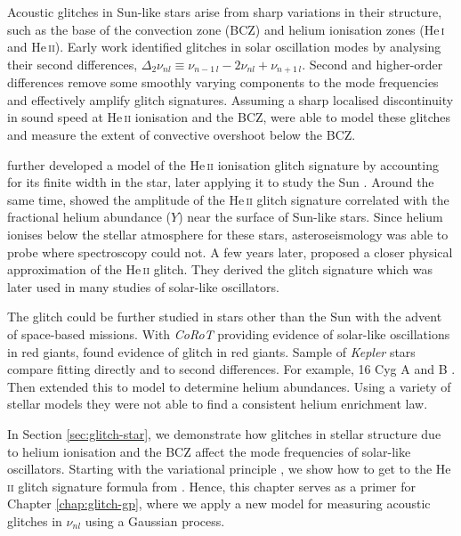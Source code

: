Acoustic glitches in Sun-like stars arise from sharp variations in their structure, such as the base of the convection zone (BCZ) and helium ionisation zones (He\,\textsc{i} and He\,\textsc{ii}). Early work identified glitches in solar oscillation modes by analysing their second differences, \(\Delta_2\nu_{nl} \equiv \nu_{n-1\,l} - 2\nu_{nl} + \nu_{n+1\,l}\). Second and higher-order differences remove some smoothly varying components to the mode frequencies and effectively amplify glitch signatures. Assuming a sharp localised discontinuity in sound speed at He\,\textsc{ii} ionisation and the BCZ, \citet{Basu.Antia.ea1994,Basu1997} were able to model these glitches and measure the extent of convective overshoot below the BCZ.

\citet{Monteiro.Thompson1998} further developed a model of the He\,\textsc{ii} ionisation glitch signature by accounting for its finite width in the star, later applying it to study the Sun \citep{Monteiro.Thompson2005}. Around the same time, \citet{Basu.Mazumdar.ea2004} showed the amplitude of the He\,\textsc{ii} glitch signature correlated with the fractional helium abundance (\(Y\)) near the surface of Sun-like stars. Since helium ionises below the stellar atmosphere for these stars, asteroseismology was able to probe where spectroscopy could not. A few years later, \citet{Houdek.Gough2007} proposed a closer physical approximation of the He\,\textsc{ii} glitch. They derived the glitch signature which was later used in many studies of solar-like oscillators.

The glitch could be further studied in stars other than the Sun with the advent of space-based missions. With \emph{CoRoT} providing evidence of solar-like oscillations in red giants, \citet{Miglio.Montalban.ea2010,Mazumdar.Michel.ea2012} found evidence of glitch in red giants. Sample of \emph{Kepler} stars \citep{Mazumdar.Monteiro.ea2012,Mazumdar.Monteiro.ea2014,Verma.Raodeo.ea2017} compare fitting directly and to second differences. For example, 16 Cyg A and B \citet{Verma.Faria.ea2014}. Then \citet{Verma.Raodeo.ea2019} extended this to model to determine helium abundances. Using a variety of stellar models they were not able to find a consistent helium enrichment law.

In Section \ref{sec:glitch-star}, we demonstrate how glitches in stellar structure due to helium ionisation and the BCZ affect the mode frequencies of solar-like oscillators. Starting with the variational principle \citep{Chandrasekhar1964}, we show how to get to the He\,\textsc{ii} glitch signature formula from \citet{Houdek.Gough2007}. Hence, this chapter serves as a primer for Chapter \ref{chap:glitch-gp}, where we apply a new model for measuring acoustic glitches in \(\nu_{nl}\) using a Gaussian process.

